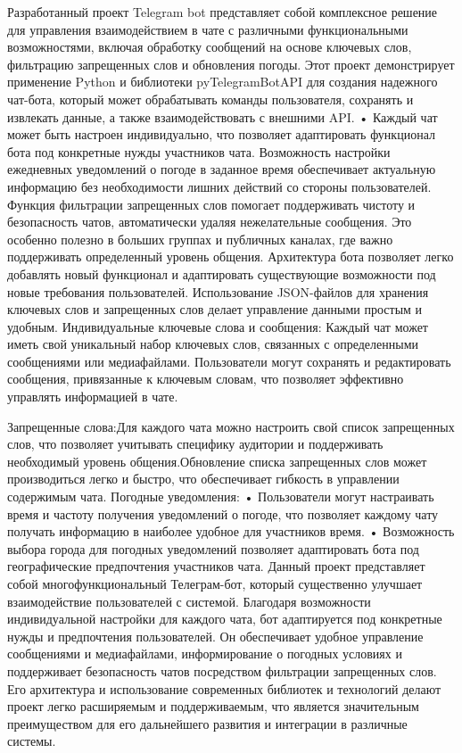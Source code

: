 \newsection
{}

Разработанный проект Telegram bot представляет собой комплексное решение для управления взаимодействием в чате с различными функциональными возможностями, включая обработку сообщений на основе ключевых слов, фильтрацию запрещенных слов и обновления погоды. Этот проект демонстрирует применение Python и библиотеки pyTelegramBotAPI для создания надежного чат-бота, который может обрабатывать команды пользователя, сохранять и извлекать данные, а также взаимодействовать с внешними API. •  Каждый чат может быть настроен индивидуально, что позволяет адаптировать функционал бота под конкретные нужды участников чата. Возможность настройки ежедневных уведомлений о погоде в заданное время обеспечивает актуальную информацию без необходимости лишних действий со стороны пользователей.
Функция фильтрации запрещенных слов помогает поддерживать чистоту и безопасность чатов, автоматически удаляя нежелательные сообщения.
Это особенно полезно в больших группах и публичных каналах, где важно поддерживать определенный уровень общения.
Архитектура бота позволяет легко добавлять новый функционал и адаптировать существующие возможности под новые требования пользователей.
Использование JSON-файлов для хранения ключевых слов и запрещенных слов делает управление данными простым и удобным.
Индивидуальные ключевые слова и сообщения:
Каждый чат может иметь свой уникальный набор ключевых слов, связанных с определенными сообщениями или медиафайлами.
Пользователи могут сохранять и редактировать сообщения, привязанные к ключевым словам, что позволяет эффективно управлять информацией в чате.

Запрещенные слова:Для каждого чата можно настроить свой список запрещенных слов, что позволяет учитывать специфику аудитории и поддерживать необходимый уровень общения.Обновление списка запрещенных слов может производиться легко и быстро, что обеспечивает гибкость в управлении содержимым чата.
Погодные уведомления:
•	Пользователи могут настраивать время и частоту получения уведомлений о погоде, что позволяет каждому чату получать информацию в наиболее удобное для участников время.
•	Возможность выбора города для погодных уведомлений позволяет адаптировать бота под географические предпочтения участников чата.
Данный проект представляет собой многофункциональный Телеграм-бот, который существенно улучшает взаимодействие пользователей с системой. Благодаря возможности индивидуальной настройки для каждого чата, бот адаптируется под конкретные нужды и предпочтения пользователей. Он обеспечивает удобное управление сообщениями и медиафайлами, информирование о погодных условиях и поддерживает безопасность чатов посредством фильтрации запрещенных слов. Его архитектура и использование современных библиотек и технологий делают проект легко расширяемым и поддерживаемым, что является значительным преимуществом для его дальнейшего развития и интеграции в различные системы.

  
